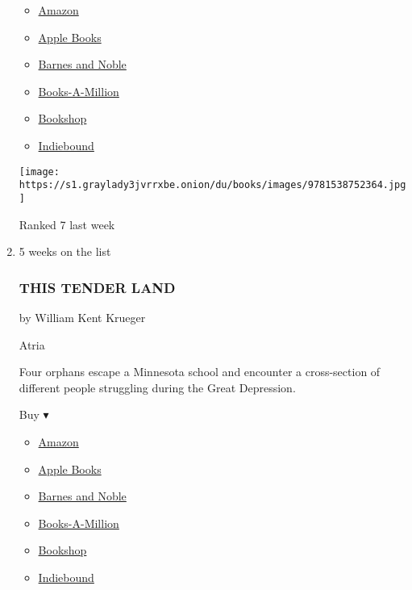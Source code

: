 \begin{enumerate}
  \begin{itemize}
  \tightlist
  \item
    \href{https://www.amazon.com/dp/1538752360?tag=NYTBSREV-20\&tag=NYTBS-20}{Amazon}
  \item
    \href{https://du-gae-books-dot-nyt-du-prd.appspot.com/buy?title=CAJUN+JUSTICE\&author=James+Patterson+and+Tucker+Axum}{Apple
    Books}
  \item
    \href{https://www.anrdoezrs.net/click-7990613-11819508?url=https\%3A\%2F\%2Fwww.barnesandnoble.com\%2Fw\%2F\%3Fean\%3D9781538752364}{Barnes
    and Noble}
  \item
    \href{https://www.anrdoezrs.net/click-7990613-35140?url=https\%3A\%2F\%2Fwww.booksamillion.com\%2Fp\%2FCAJUN\%2BJUSTICE\%2FJames\%2BPatterson\%2Band\%2BTucker\%2BAxum\%2F9781538752364}{Books-A-Million}
  \item
    \href{https://bookshop.org/a/3546/9781538752364}{Bookshop}
  \item
    \href{https://www.indiebound.org/book/9781538752364?aff=NYT}{Indiebound}
  \end{itemize}

  \texttt{[image: https://s1.graylady3jvrrxbe.onion/du/books/images/9781538752364.jpg]}

  Ranked 7 last week
\item
  5 weeks on the list

  \hypertarget{this-tender-land}{%
  \subsubsection{THIS TENDER LAND}\label{this-tender-land}}

  by William Kent Krueger

  Atria

  Four orphans escape a Minnesota school and encounter a cross-section
  of different people struggling during the Great Depression.

  Buy ▾

  \begin{itemize}
  \tightlist
  \item
    \href{https://www.amazon.com/This-Tender-Land-William-Krueger/dp/1476749299?tag=NYTBS-20}{Amazon}
  \item
    \href{https://du-gae-books-dot-nyt-du-prd.appspot.com/buy?title=THIS+TENDER+LAND\&author=William+Kent+Krueger}{Apple
    Books}
  \item
    \href{https://www.anrdoezrs.net/click-7990613-11819508?url=https\%3A\%2F\%2Fwww.barnesandnoble.com\%2Fw\%2F\%3Fean\%3D9781476749303}{Barnes
    and Noble}
  \item
    \href{https://www.anrdoezrs.net/click-7990613-35140?url=https\%3A\%2F\%2Fwww.booksamillion.com\%2Fp\%2FTHIS\%2BTENDER\%2BLAND\%2FWilliam\%2BKent\%2BKrueger\%2F9781476749303}{Books-A-Million}
  \item
    \href{https://bookshop.org/a/3546/9781476749303}{Bookshop}
  \item
    \href{https://www.indiebound.org/book/9781476749303?aff=NYT}{Indiebound}
  \end{itemize}


\end{enumerate}
